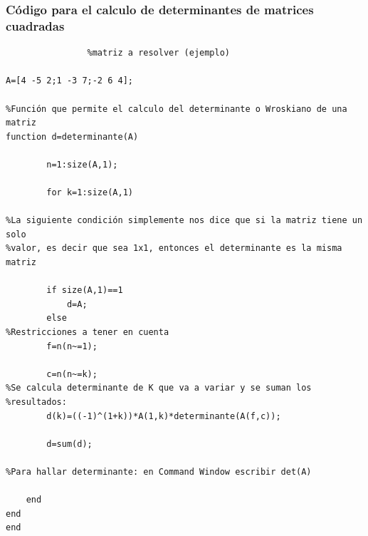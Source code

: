 \documentclass[titlepage]{article}
\begin{document}
        \subsubsection{Código para el calculo de determinantes de matrices cuadradas}    
        	\begin{verbatim}
        		%matriz a resolver (ejemplo)

A=[4 -5 2;1 -3 7;-2 6 4];

%Función que permite el calculo del determinante o Wroskiano de una matriz
function d=determinante(A)

		n=1:size(A,1);

		for k=1:size(A,1)

%La siguiente condición simplemente nos dice que si la matriz tiene un solo
%valor, es decir que sea 1x1, entonces el determinante es la misma matriz

    	if size(A,1)==1
        	d=A;
    	else
%Restricciones a tener en cuenta
        f=n(n~=1);
        
        c=n(n~=k);
%Se calcula determinante de K que va a variar y se suman los
%resultados:
        d(k)=((-1)^(1+k))*A(1,k)*determinante(A(f,c));
        
        d=sum(d);

%Para hallar determinante: en Command Window escribir det(A)
        
    end
end
end	
        	\end{verbatim}
                \newpage
                
\end{document}
